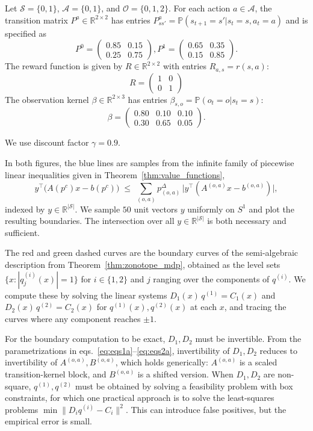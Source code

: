 \documentclass{article}
\theoremstyle{definition}
\theoremstyle{remark}
\begin{document}
Let $\mathcal S=\{0,1\}$, $\mathcal A=\{0,1\}$, and $\mathcal O=\{0,1,2\}$.
For each action $a\in\mathcal A$, the transition matrix $P^a\in\mathbb R^{2\times 2}$ has entries
$P^a_{ss'}=\mathbb P(s_{t+1}=s' |  s_t=s,a_t=a)$ and is specified as
\[
P^0 =
\begin{pmatrix}
0.85 & 0.15\\
0.25 & 0.75
\end{pmatrix},
P^1 =
\begin{pmatrix}
0.65 & 0.35\\
0.15 & 0.85
\end{pmatrix}.
\]
The reward function is given by $R\in\mathbb R^{2\times 2}$ with entries $R_{a,s}=r(s,a)$:
$$
R = \begin{pmatrix}
1 & 0\\
0 & 1
\end{pmatrix}
$$
The observation kernel $\beta\in\mathbb R^{2\times 3}$ has entries
$\beta_{s,o}=\mathbb P(o_t=o |  s_t=s)$:
$$
\beta =
\begin{pmatrix}
0.80 & 0.10 & 0.10\\
0.30 & 0.65 & 0.05
\end{pmatrix}.
$$

We use discount factor $\gamma=0.9$.

In both figures, the blue lines are samples from the infinite family of piecewise linear inequalities given in Theorem~\ref{thm:value_functions},
\[
y^\top \bigl(A(p^c) x - b(p^c)\bigr) \;\le\; \sum_{(o,a)} p^\Delta_{(o,a)} \,\bigl| y^\top (A^{(o,a)} x - b^{(o,a)}) \bigr|,
\]
indexed by $y \in \mathbb{R}^{|\mathcal{S}|}$. We sample $50$ unit vectors $y$ uniformly on $S^{1}$ and plot the resulting boundaries. The intersection over all $y \in \mathbb{R}^{|\mathcal{S}|}$ is both necessary and sufficient.

The red and green dashed curves are the boundary curves of the semi-algebraic description from Theorem~\ref{thm:zonotope_mdp}, obtained as the level sets $\{x : |q^{(i)}_j(x)| = 1\}$ for $i \in \{1, 2\}$ and $j$ ranging over the components of $q^{(i)}$. We compute these by solving the linear systems $D_1(x)\, q^{(1)} = C_1(x)$ and $D_2(x)\, q^{(2)} = C_2(x)$ for $q^{(1)}(x), q^{(2)}(x)$ at each $x$, and tracing the curves where any component reaches $\pm 1$.

For the boundary computation to be exact, $D_1, D_2$ must be invertible. From the parametrizations in eqs.~\ref{eq:eqs1a}--\ref{eq:eqs2a}, invertibility of $D_1, D_2$ reduces to invertibility of $A^{(o,a)}, B^{(o,a)}$, which holds generically: $A^{(o,a)}$ is a scaled transition-kernel block, and $B^{(o,a)}$ is a shifted version. When $D_1, D_2$ are non-square, $q^{(1)}, q^{(2)}$ must be obtained by solving a feasibility problem with box constraints, for which one practical approach is to solve the least-squares problems $\min \|D_i q^{(i)} - C_i\|^2$. This can introduce false positives, but the empirical error is small.
\end{document}
